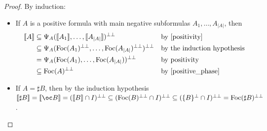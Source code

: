 \documentclass[11pt]{article}
\newcommand\0{\textbf{0}}
\newcommand\1{\textbf{1}}
\newcommand\size[1]{{\lvert #1 \rvert}}
\newcommand\sem[1]{{\llbracket #1 \rrbracket}}
\newcommand\biperp{{\perp\perp}}
\newcommand\Foc{\textup{Foc}}
\begin{document}
\begin{proof}
    By induction:
    \begin{itemize}
        \item If $A$ is a positive formula with main negative subformulas $A_1, \dots, A_\size{A}$, then \begin{align*}
            \sem{A}
            &\subseteq \Psi_A(\sem{A_1}, \dots, \sem{A_\size{A}})^\biperp &&\text{by \cref{positivity}} \\
            &\subseteq \Psi_A(\Foc(A_1)^\biperp, \dots, \Foc(A_\size{A})^\biperp)^\biperp &&\text{by the induction hypothesis} \\
            &= \Psi_A(\Foc(A_1), \dots, \Foc(A_\size{A}))^\biperp &&\text{by positivity} \\
            &\subseteq \Foc(A)^\biperp &&\text{by \cref{positive_phase}}
        \end{align*}
        \item If $A = \sharp B$, then by the induction hypothesis
        $\sem{\sharp B} = \sem{\oc B} = (\sem{B} \cap I)^\biperp \subseteq (\Foc(B)^\biperp \cap I)^\biperp \subseteq (\{B\}^\perp \cap I)^\biperp = \Foc(\sharp B)^\biperp$.


\end{itemize}
\end{proof}
\end{document}
